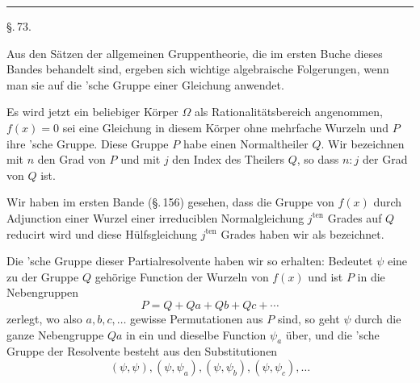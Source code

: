 
\begin{center}

\bigskip

\end{center}

\bigskip
\begin{center}
\rule{4cm}{0.4pt}
\end{center}
\bigskip

\begin{center}
\S.\,73.

\medskip

\end{center}

\bigskip

Aus den S\"atzen der allgemeinen Gruppentheorie, die im ersten Buche dieses Bandes
behandelt sind, ergeben sich wichtige algebraische Folgerungen, wenn man sie auf die
'sche Gruppe einer Gleichung anwendet.

Es wird jetzt ein beliebiger K\"orper $\Omega$ als Rationalit\"atsbereich angenommen,
$f(x) = 0$ sei eine Gleichung in diesem K\"orper ohne mehrfache Wurzeln und $P$ ihre
'sche Gruppe. Diese Gruppe $P$ habe einen Normaltheiler $Q$. Wir bezeichnen mit
$n$ den Grad von $P$ und mit $j$ den Index des Theilers $Q$, so dass $n : j$ der Grad
von $Q$ ist.

Wir haben im ersten Bande (\S.\,156) gesehen, dass die Gruppe von $f(x)$ durch
Adjunction einer Wurzel einer irreduciblen Normalgleichung $j^{\mathrm{ten}}$ Grades
auf $Q$ reducirt wird und diese H\"ulfsgleichung $j^{\mathrm{ten}}$ Grades haben wir
als  bezeichnet.

Die 'sche Gruppe dieser Partialresolvente haben wir so erhalten: Bedeutet
$\psi$ eine zu der Gruppe $Q$ geh\"orige Function der Wurzeln von $f(x)$ und ist $P$
in die Nebengruppen
\[
P = Q + Qa + Qb + Qc + \cdots
\]
zerlegt, wo also $a, b, c, \ldots$ gewisse Permutationen aus $P$ sind, so geht $\psi$
durch die ganze Nebengruppe $Qa$ in ein und dieselbe Function $\psi_a$ \"uber, und die
'sche Gruppe der Resolvente besteht aus den Substitutionen
\[
(\psi, \psi), (\psi, \psi_a), (\psi, \psi_b), (\psi, \psi_c), \ldots
\]
